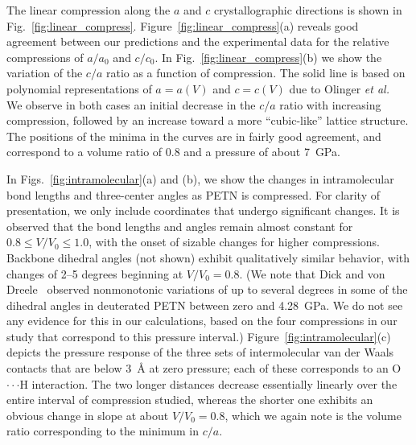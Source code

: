 \documentclass[prb,aps,nobibnotes,twocolumn,doublespace,twocolumngrid,superbib]{revtex4}
\begin{document}
The linear compression along the $a$ and $c$ crystallographic
directions is shown in Fig.~\ref{fig:linear_compress}.
Figure~\ref{fig:linear_compress}(a) reveals good agreement between our
predictions and the experimental data for the relative compressions of
$a/a_0$ and $c/c_0$.
In Fig.~\ref{fig:linear_compress}(b) we show the variation of the
$c/a$ ratio as a function of compression.
The solid line is based on polynomial representations of $a=a(V)$ and
$c=c(V)$ due to Olinger {\it et al.}~\cite{Olinger_1975v62} We observe
in both cases an initial decrease in the $c/a$ ratio with increasing
compression, followed by an increase toward a more ``cubic-like''
lattice structure.  The positions of the minima in the curves are in
fairly good agreement, and correspond to a volume ratio of 0.8 and a
pressure of about 7~GPa.

In Figs.~\ref{fig:intramolecular}(a) and (b), we show the changes in
intramolecular bond lengths and three-center angles as PETN is
compressed.  For clarity of presentation, we only include coordinates that
undergo significant changes.  It is observed that the bond lengths and angles
remain almost constant for $ 0.8 \leq V/V_0 \leq 1.0$, with the onset of
sizable changes for higher compressions.  Backbone dihedral angles (not shown)
exhibit qualitatively similar behavior, with changes of 2--5 degrees beginning
at $V/V_0=0.8$. (We note that Dick and von Dreele~\cite{Dick_1997} observed
nonmonotonic variations of up to several degrees in some of the dihedral
angles in deuterated PETN between zero and 4.28~GPa.  We do not see any
evidence for this in our calculations, based on the four compressions in
our study that correspond to this pressure interval.)
Figure~\ref{fig:intramolecular}(c) depicts the pressure response of 
the three sets of intermolecular van der Waals contacts that are below 
3~\AA\/ at zero
pressure; each of these corresponds to an O$\cdot\cdot\cdot$H
interaction.  The two longer distances decrease essentially linearly
over the entire interval of compression studied, whereas the shorter
one exhibits an obvious change in slope at about $V/V_0=0.8$, which we
again note is the volume ratio corresponding to the minimum in $c/a$.
\end{document}
